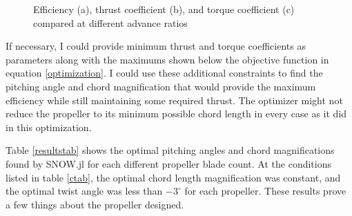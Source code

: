 \documentclass[journal ]{new-aiaa}
\newcounter{ctab}
\begin{document}
\begin{figure}[H]
\centering

	\hspace{1em}
	\caption{Efficiency (a), thrust coefficient (b), and torque coefficient (c) compared at different advance ratios}
	\captionsetup{aboveskip=0pt,font=it}
	\label{efftqtab}
\end{figure}

If necessary, I could provide minimum thrust and torque coefficients as parameters along with the maximums shown below the objective function in equation \ref{optimization}. I could use these additional constraints to find the pitching angle and chord magnification that would provide the maximum efficiency while still maintaining some required thrust. The optimizer might not reduce the propeller to its minimum possible chord length in every case as it did in this optimization.

Table \ref{resultstab} shows the optimal pitching angles and chord magnifications found by SNOW.jl for each different propeller blade count. At the conditions listed in table \ref{ctab}, the optimal chord length magnification was constant, and the optimal twist angle was less than $-3^{\circ}$ for each propeller. These results prove a few things about the propeller designed.
\end{document}
